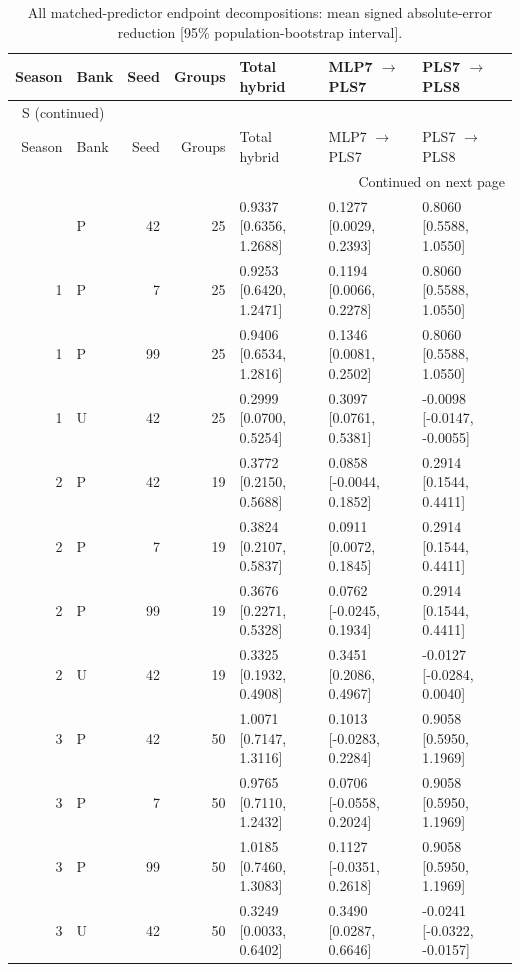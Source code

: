 \documentclass[10pt,a4paper]{article}
\renewcommand{\thetable}{S\arabic{table}}
\begin{document}
\begingroup\footnotesize
\setlength{\tabcolsep}{3.5pt}
\renewcommand{\arraystretch}{1.10}
\begin{longtable}{rlrrlll}
\caption{All matched-predictor endpoint decompositions: mean signed absolute-error reduction [95\% population-bootstrap interval].}\label{tab:endpoint}\\
\toprule
Season & Bank & Seed & Groups & Total hybrid & MLP7 $\rightarrow$ PLS7 & PLS7 $\rightarrow$ PLS8 \\
\midrule
\endfirsthead
\multicolumn{7}{l}{\tablename~\thetable{} (continued)}\\
\toprule
Season & Bank & Seed & Groups & Total hybrid & MLP7 $\rightarrow$ PLS7 & PLS7 $\rightarrow$ PLS8 \\
\midrule
\endhead
\midrule
\multicolumn{7}{r}{Continued on next page}\\
\endfoot
\bottomrule
\endlastfoot
1 & P & 42 & 25 & 0.9337 [0.6356, 1.2688] & 0.1277 [0.0029, 0.2393] & 0.8060 [0.5588, 1.0550] \\
1 & P & 7 & 25 & 0.9253 [0.6420, 1.2471] & 0.1194 [0.0066, 0.2278] & 0.8060 [0.5588, 1.0550] \\
1 & P & 99 & 25 & 0.9406 [0.6534, 1.2816] & 0.1346 [0.0081, 0.2502] & 0.8060 [0.5588, 1.0550] \\
1 & U & 42 & 25 & 0.2999 [0.0700, 0.5254] & 0.3097 [0.0761, 0.5381] & -0.0098 [-0.0147, -0.0055] \\
2 & P & 42 & 19 & 0.3772 [0.2150, 0.5688] & 0.0858 [-0.0044, 0.1852] & 0.2914 [0.1544, 0.4411] \\
2 & P & 7 & 19 & 0.3824 [0.2107, 0.5837] & 0.0911 [0.0072, 0.1845] & 0.2914 [0.1544, 0.4411] \\
2 & P & 99 & 19 & 0.3676 [0.2271, 0.5328] & 0.0762 [-0.0245, 0.1934] & 0.2914 [0.1544, 0.4411] \\
2 & U & 42 & 19 & 0.3325 [0.1932, 0.4908] & 0.3451 [0.2086, 0.4967] & -0.0127 [-0.0284, 0.0040] \\
3 & P & 42 & 50 & 1.0071 [0.7147, 1.3116] & 0.1013 [-0.0283, 0.2284] & 0.9058 [0.5950, 1.1969] \\
3 & P & 7 & 50 & 0.9765 [0.7110, 1.2432] & 0.0706 [-0.0558, 0.2024] & 0.9058 [0.5950, 1.1969] \\
3 & P & 99 & 50 & 1.0185 [0.7460, 1.3083] & 0.1127 [-0.0351, 0.2618] & 0.9058 [0.5950, 1.1969] \\
3 & U & 42 & 50 & 0.3249 [0.0033, 0.6402] & 0.3490 [0.0287, 0.6646] & -0.0241 [-0.0322, -0.0157] \\
\end{longtable}
\endgroup
\end{document}
